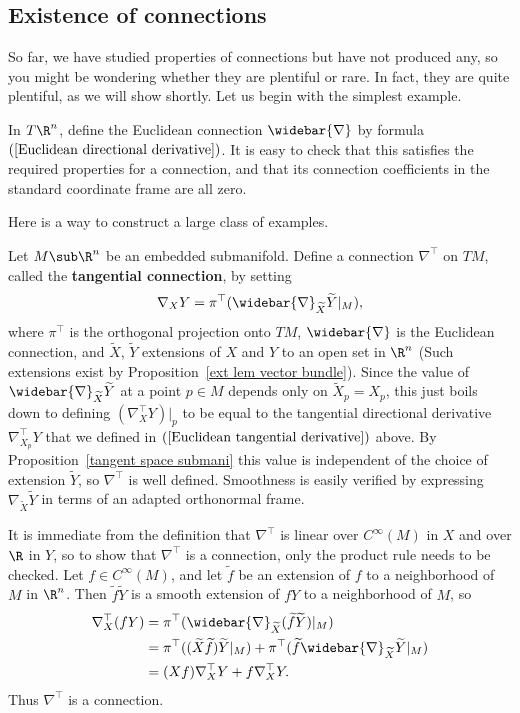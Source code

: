\subsection{Existence of connections}
So far, we have studied properties of connections but have not produced any, so you might be 
wondering whether they are plentiful or rare. In fact, they are quite plentiful, as we will 
show shortly. Let us begin with the simplest example.
\begin{example}\label{Euclidean connection}
In $T\R^n$, define the Euclidean connection $\widebar{\nabla}$ by formula $(\ref{Euclidean directional derivative})$. 
It is easy to check that this satisfies the required properties for a connection, and that 
its connection coefficients in the standard coordinate frame are all zero.
\end{example}
Here is a way to construct a large class of examples.
\begin{example}\label{Euclidean tangential connection}
Let $M\sub\R^n$ be an embedded submanifold. Define a connection $\nabla^{\top}$ on $TM$, called 
the \textbf{tangential connection}, by setting
\[\nabla_XY=\pi^{\top}(\widebar{\nabla}_{\widetilde{X}}\widetilde{Y}|_M),\]
where $\pi^{\top}$ is the orthogonal projection onto $TM$, $\widebar{\nabla}$ is the Euclidean 
connection, and $\widetilde{X}$, $\widetilde{Y}$ extensions of $X$ and $Y$ to an open set in $\R^n$ 
(Such extensions exist by Proposition~\ref{ext lem vector bundle}). Since the value of $\widebar{\nabla}_{\widetilde{X}}\widetilde{Y}$ 
at a point $p\in M$ depends only on $\widetilde{X}_p=X_p$, this just boils down to defining $(\nabla^{\top}_XY)|_p$ 
to be equal to the tangential directional derivative $\nabla_{X_p}^{\top}Y$ that we defined 
in $(\ref{Euclidean tangential derivative})$ above. By Proposition~\ref{tangent space submani} 
this value is independent of the choice of extension $\widetilde{Y}$, so $\nabla^{\top}$ is 
well defined. Smoothness is easily verified by expressing $\nabla_{\widetilde{X}}\widetilde{Y}$ 
in terms of an adapted orthonormal frame.\par
It is immediate from the definition that $\nabla^{\top}$ is linear over $C^{\infty}(M)$ in $X$ 
and over $\R$ in $Y$, so to show that $\nabla^{\top}$ is a connection, only the product rule 
needs to be checked. Let $f\in C^{\infty}(M)$, and let $\widetilde{f}$ be an extension of $f$ 
to a neighborhood of $M$ in $\R^n$. Then $\widetilde{f}\widetilde{Y}$ is a smooth extension 
of $fY$ to a neighborhood of $M$, so
\begin{align*}
\nabla^{\top}_X(fY)&=\pi^{\top}(\widebar{\nabla}_{\widetilde{X}}(\widetilde{f}\widetilde{Y})|_M)\\
&=\pi^{\top}((\widetilde{X}\widetilde{f})\widetilde{Y}|_M)+\pi^{\top}(\widetilde{f}\widebar{\nabla}_{\widetilde{X}}\widetilde{Y}|_M)\\
&=(Xf)\nabla_X^{\top}Y+f\nabla_X^{\top}Y.
\end{align*}
Thus $\nabla^{\top}$ is a connection.
\end{example}

